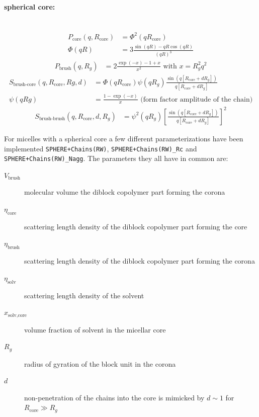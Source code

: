 \paragraph{spherical core:}
~\\
\begin{align}
P_\text{core}(q,R_\text{core}) &= \Phi^2(qR_\text{core}) \\
\Phi(qR) &= 3\frac{\sin(qR)-qR\cos(qR)}{(qR)^3}
\end{align}
\begin{align}
P_\text{brush}(q,R_g)&= 2\frac{\exp(-x)-1+x}{x^2} \text{~with~} x = R_g^2q^2
\end{align}
\begin{align}
S_\text{brush-core}(q,R_\text{core},Rg,d) &= \Phi(qR_\text{core})\psi(qR_g)\frac{\sin(q[R_\text{core}+dR_g])}{q[R_\text{core}+dR_g]} \\
\psi(qRg) &= \frac{1-\exp(-x)}{x} \text{~(form factor amplitude of the chain)} \nonumber
\end{align}
\begin{align}
S_\text{brush-brush}(q,R_\text{core},d,R_g) &= \psi^2(qR_g)\left[\frac{\sin(q[R_\text{core}+dR_g])}{q[R_\text{core}+dR_g]}\right]^2
\end{align}

\vspace{5mm}

For micelles with a spherical core a few different parameterizations have been
implemented \texttt{SPHERE+Chains(RW)}, \texttt{SPHERE+Chains(RW)\_Rc} and
\texttt{SPHERE+Chains(RW)\_Nagg}.
The parameters they all have in common are:
\begin{description}
\item[$V_\text{brush}$] molecular volume the diblock copolymer part forming the corona
\item[$\eta_\text{core}$] scattering length density of the diblock copolymer part forming the core
\item[$\eta_\text{brush}$] scattering length density of the diblock copolymer part forming the corona
\item[$\eta_\text{solv}$] scattering length density of the solvent
\item[$x_\text{solv,core}$] volume fraction of solvent in the micellar core
\item[$R_g$] radius of gyration of the block unit in the corona
\item[$d$]  non-penetration of the chains into the core is mimicked by
$d\sim 1$ for $R_\text{core}\gg R_g$
\end{description}

